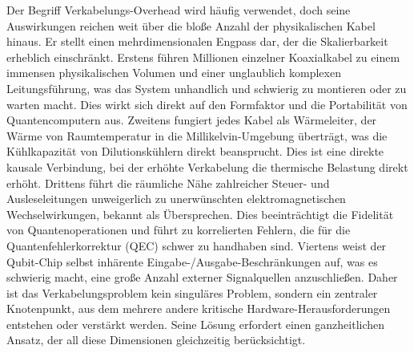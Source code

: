 Der Begriff \glqq Verkabelungs-Overhead\grqq{} wird häufig verwendet, doch seine Auswirkungen reichen weit über die bloße Anzahl der physikalischen Kabel hinaus. Er stellt einen mehrdimensionalen Engpass dar, der die Skalierbarkeit erheblich einschränkt. Erstens führen Millionen einzelner Koaxialkabel zu einem immensen physikalischen Volumen und einer unglaublich komplexen Leitungsführung, was das System unhandlich und schwierig zu montieren oder zu warten macht. Dies wirkt sich direkt auf den Formfaktor und die Portabilität von Quantencomputern aus. Zweitens fungiert jedes Kabel als Wärmeleiter, der Wärme von Raumtemperatur in die Millikelvin-Umgebung überträgt, was die Kühlkapazität von Dilutionskühlern direkt beansprucht. Dies ist eine direkte kausale Verbindung, bei der erhöhte Verkabelung die thermische Belastung direkt erhöht. Drittens führt die räumliche Nähe zahlreicher Steuer- und Ausleseleitungen unweigerlich zu unerwünschten elektromagnetischen Wechselwirkungen, bekannt als Übersprechen. Dies beeinträchtigt die Fidelität von Quantenoperationen und führt zu korrelierten Fehlern, die für die Quantenfehlerkorrektur (QEC) schwer zu handhaben sind. Viertens weist der Qubit-Chip selbst inhärente Eingabe-/Ausgabe-Beschränkungen auf, was es schwierig macht, eine große Anzahl externer Signalquellen anzuschließen. Daher ist das Verkabelungsproblem kein singuläres Problem, sondern ein zentraler Knotenpunkt, aus dem mehrere andere kritische Hardware-Herausforderungen entstehen oder verstärkt werden. Seine Lösung erfordert einen ganzheitlichen Ansatz, der all diese Dimensionen gleichzeitig berücksichtigt.
